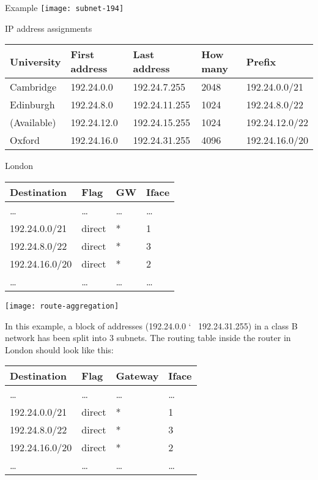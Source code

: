 \begin{frame}{Example}
  \vspace*{-2em}
  \texttt{[image: subnet-194]}

  \begin{iblock}{IP address assignments}
    {\scriptsize\ttfamily
      \begin{tabular}{lllll}\toprule
        \textrm{University}&\textrm{First address}&\textrm{Last address}&\textrm{How many}&\textrm{Prefix}\\\midrule
        Cambridge&192.24.0.0&192.24.7.255&2048&192.24.0.0/21\\
        Edinburgh&192.24.8.0&192.24.11.255&1024&192.24.8.0/22\\
        (Available)&192.24.12.0&192.24.15.255&1024&192.24.12.0/22\\
        Oxford&192.24.16.0&192.24.31.255&4096&192.24.16.0/20\\\bottomrule
      \end{tabular}}
  \end{iblock}  
  \vspace*{-1em}
  \begin{minipage}{.4\linewidth}
    \begin{iblock}{London}
      {\ttfamily\scriptsize
      \begin{tabular}{llll}\hline
        Destination&Flag&GW&Iface\\\hline
        \ldots&\ldots&\ldots&\ldots\\
        192.24.0.0/21&direct&*&1\\
        192.24.8.0/22&direct&*&3\\
        192.24.16.0/20&direct&*&2\\
        \ldots&\ldots&\ldots&\ldots\\\hline
      \end{tabular}}
    \end{iblock}    
  \end{minipage}\hfill
  \begin{minipage}{.55\linewidth}
    \texttt{[image: route-aggregation]}
  \end{minipage}
\end{frame}

In this example, a block of addresses (192.24.0.0 \char`~ 192.24.31.255) in a class B
network has been split into 3 subnets. The routing table inside the router in London
should look like this:
\begin{center}
  \begin{tabular}{llll}\toprule
    Destination&Flag&Gateway&Iface\\\midrule
    \ldots&\ldots&\ldots&\ldots\\
    192.24.0.0/21&direct&*&1\\
    192.24.8.0/22&direct&*&3\\
    192.24.16.0/20&direct&*&2\\
    \ldots&\ldots&\ldots&\ldots\\
  \end{tabular}
\end{center}

